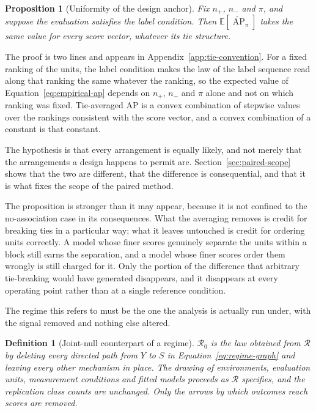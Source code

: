 \documentclass[11pt]{article}
\newcommand{\AP}{\operatorname{AP}}
\newcommand{\Regime}{\mathcal{R}}
\newcommand{\E}{\mathbb{E}}
\newcommand{\APta}{\widetilde{\AP}}
\newtheorem{definition}{Definition}
\newtheorem{proposition}{Proposition}
\theoremstyle{remark}
\begin{document}
\begin{proposition}[Uniformity of the design anchor]
\label{prop:uniformity}
Fix $n_+$, $n_-$ and $\pi$, and suppose the evaluation satisfies the label condition. Then $\E[\APta_\pi]$ takes the same value for every score vector, whatever its tie structure.
\end{proposition}

The proof is two lines and appears in Appendix~\ref{app:tie-convention}. For a fixed ranking of the units, the label condition makes the law of the label sequence read along that ranking the same whatever the ranking, so the expected value of Equation~\eqref{eq:empirical-ap} depends on $n_+$, $n_-$ and $\pi$ alone and not on which ranking was fixed. Tie-averaged AP is a convex combination of stepwise values over the rankings consistent with the score vector, and a convex combination of a constant is that constant.

The hypothesis is that every arrangement is equally likely, and not merely that the arrangements a design happens to permit are. Section~\ref{sec:paired-scope} shows that the two are different, that the difference is consequential, and that it is what fixes the scope of the paired method.

The proposition is stronger than it may appear, because it is not confined to the no-association case in its consequences. What the averaging removes is credit for breaking ties in a particular way; what it leaves untouched is credit for ordering units correctly. A model whose finer scores genuinely separate the units within a block still earns the separation, and a model whose finer scores order them wrongly is still charged for it. Only the portion of the difference that arbitrary tie-breaking would have generated disappears, and it disappears at every operating point rather than at a single reference condition.

The regime this refers to must be the one the analysis is actually run under, with the signal removed and nothing else altered.

\begin{definition}[Joint-null counterpart of a regime]
\label{def:joint-null}
$\Regime_0$ is the law obtained from $\Regime$ by deleting every directed path from $Y$ to $S$ in Equation~\eqref{eq:regime-graph} and leaving every other mechanism in place. The drawing of environments, evaluation units, measurement conditions and fitted models proceeds as $\Regime$ specifies, and the replication class counts are unchanged. Only the arrows by which outcomes reach scores are removed.
\end{definition}
\end{document}

